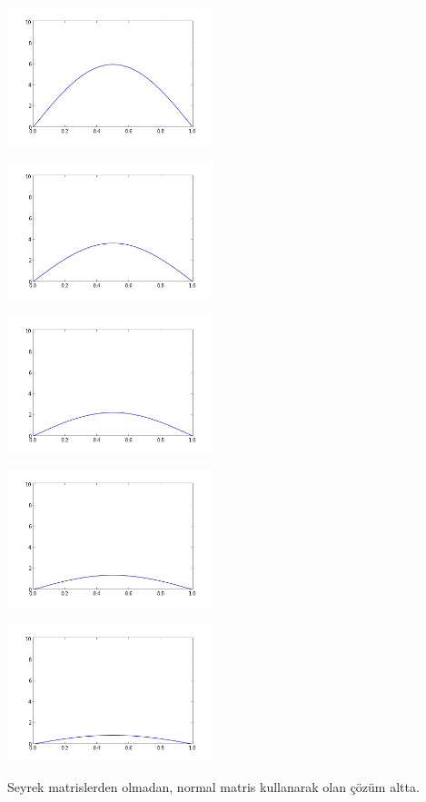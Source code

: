 \documentclass[12pt,fleqn]{article}\usepackage{../../common}
\begin{document}
\includegraphics[height=4cm]{heat-20.png}

\includegraphics[height=4cm]{heat-40.png}

\includegraphics[height=4cm]{heat-60.png}

\includegraphics[height=4cm]{heat-80.png}

\includegraphics[height=4cm]{heat-100.png}

Seyrek matrislerden olmadan, normal matris kullanarak olan çözüm altta.
\end{document}
